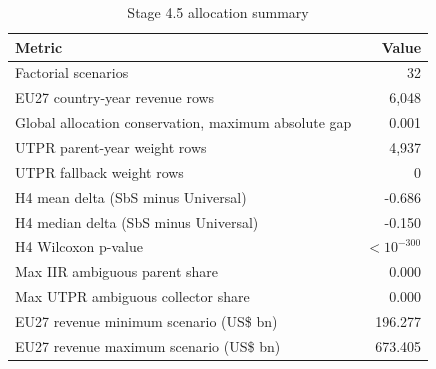 \begin{table}[H]
\centering
\footnotesize
\setlength{\tabcolsep}{3pt}
\caption{Stage 4.5 allocation summary}
\label{tab:app_stage45_summary}
\begin{tabular}{@{}lr@{}}
\toprule
Metric & Value \\
\midrule
Factorial scenarios &              32 \\
EU27 country-year revenue rows &           6,048 \\
Global allocation conservation, maximum absolute gap &               0.001 \\
UTPR parent-year weight rows &           4,937 \\
UTPR fallback weight rows &               0 \\
H4 mean delta (SbS minus Universal) &  -0.686 \\
H4 median delta (SbS minus Universal) &  -0.150 \\
H4 Wilcoxon p-value & $< 10^{-300}$ \\
Max IIR ambiguous parent share &               0.000 \\
Max UTPR ambiguous collector share &               0.000 \\
EU27 revenue minimum scenario (US\$ bn) & 196.277 \\
EU27 revenue maximum scenario (US\$ bn) & 673.405 \\
\bottomrule
\end{tabular}
\end{table}
